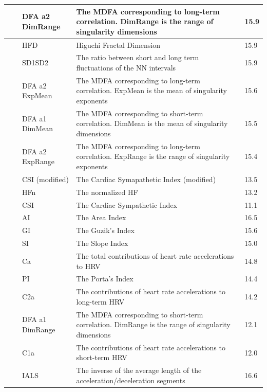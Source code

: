 \documentclass[
  english,
  jou,floatsintext]{apa6}
\begin{document}
\begin{table}[!h]
\begin{tabular}[t]{>{\raggedright\arraybackslash}p{8em}>{\raggedright\arraybackslash}p{9em}lll}
\cmidrule{3-5}
 &  & DFA a2 DimRange & The MDFA corresponding to long-term correlation. DimRange is the range of singularity dimensions & 15.9\\
\cmidrule{3-5}
 &  & HFD & Higuchi Fractal Dimension & 15.9\\
\cmidrule{3-5}
 &  & SD1SD2 & The ratio between short and long term fluctuations of the NN intervals & 15.9\\
\cmidrule{3-5}
 &  & DFA a2 ExpMean & The MDFA corresponding to long-term correlation. ExpMean is the mean of singularity exponents & 15.6\\
\cmidrule{3-5}
 &  & DFA a1 DimMean & The MDFA corresponding to short-term correlation. DimMean is the mean of singularity dimensions & 15.5\\
\cmidrule{3-5}
 &  & DFA a2 ExpRange & The MDFA corresponding to long-term correlation. ExpRange is the range of singularity exponents & 15.4\\
\cmidrule{3-5}
 &  & CSI (modified) & The Cardiac Symapathetic Index (modified) & 13.5\\
\cmidrule{3-5}
 &  & HFn & The normalized HF & 13.2\\
\cmidrule{3-5}
\multirow[t]{-28}{8em}{\raggedright\arraybackslash Frequency/Complexity} & \multirow[t]{-13}{9em}{\raggedright\arraybackslash Relative Frequency/Complexity} & CSI & The Cardiac Sympathetic Index & 11.1\\
\cmidrule{1-5}
 &  & AI & The Area Index & 16.5\\
\cmidrule{3-5}
 &  & GI & The Guzik's Index & 15.6\\
\cmidrule{3-5}
 &  & SI & The Slope Index & 15.0\\
\cmidrule{3-5}
 &  & Ca & The total contributions of heart rate accelerations to HRV & 14.8\\
\cmidrule{3-5}
 &  & PI & The Porta's Index & 14.4\\
\cmidrule{3-5}
 &  & C2a & The contributions of heart rate accelerations to long-term HRV & 14.2\\
\cmidrule{3-5}
 &  & DFA a1 DimRange & The MDFA corresponding to short-term correlation. DimRange is the range of singularity dimensions & 12.1\\
\cmidrule{3-5}
 & \multirow[t]{-8}{9em}{\raggedright\arraybackslash Heart Rate Asymmetry} & C1a & The contributions of heart rate accelerations to short-term HRV & 12.0\\
\cmidrule{2-5}
 &  & IALS & The inverse of the average length of the acceleration/deceleration segments & 16.6\\

\end{tabular}
\end{table}
\end{document}
